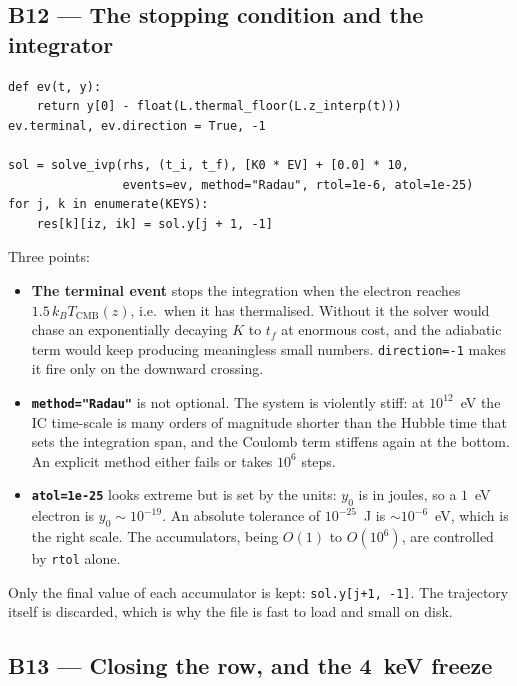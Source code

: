 \documentclass[11pt,a4paper]{article}
\newcommand{\code}[1]{\texttt{\small #1}}
\begin{document}
\subsection*{B12 --- The stopping condition and the integrator}

\begin{lstlisting}
def ev(t, y):
    return y[0] - float(L.thermal_floor(L.z_interp(t)))
ev.terminal, ev.direction = True, -1

sol = solve_ivp(rhs, (t_i, t_f), [K0 * EV] + [0.0] * 10,
                events=ev, method="Radau", rtol=1e-6, atol=1e-25)
for j, k in enumerate(KEYS):
    res[k][iz, ik] = sol.y[j + 1, -1]
\end{lstlisting}

Three points:

\begin{itemize}[leftmargin=1.3em]
\item \textbf{The terminal event} stops the integration when the electron
      reaches $1.5\,k_B T_{\mathrm{CMB}}(z)$, i.e.\ when it has thermalised.
      Without it the solver would chase an exponentially decaying $K$ to
      $t_f$ at enormous cost, and the adiabatic term would keep producing
      meaningless small numbers.  \code{direction=-1} makes it fire only on the
      downward crossing.
\item \textbf{\code{method="Radau"}} is not optional.  The system is violently
      stiff: at $10^{12}$~eV the IC time-scale is many orders of magnitude
      shorter than the Hubble time that sets the integration span, and the
      Coulomb term stiffens again at the bottom.  An explicit method either
      fails or takes $10^{6}$ steps.
\item \textbf{\code{atol=1e-25}} looks extreme but is set by the units: $y_0$
      is in joules, so a $1$~eV electron is $y_0\sim10^{-19}$.  An absolute
      tolerance of $10^{-25}$~J is $\sim10^{-6}$~eV, which is the right scale.
      The accumulators, being $O(1)$ to $O(10^6)$, are controlled by
      \code{rtol} alone.
\end{itemize}

Only the final value of each accumulator is kept: \code{sol.y[j+1, -1]}.  The
trajectory itself is discarded, which is why the file is fast to load and small
on disk.

\subsection*{B13 --- Closing the row, and the 4~keV freeze}
\end{document}
